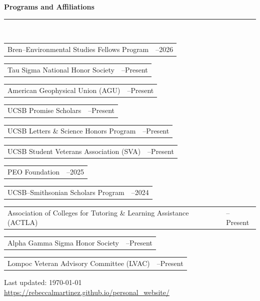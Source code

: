 \documentclass[letterpaper]{article}
\makeatletter
\def\footerlink{https://rebeccalmartinez.github.io/personal\_website/}
\newcommand{\sectionheader}[1]{%
  \noindent\textbf{\large #1} \\[-1ex]
  \noindent\rule{\linewidth}{0.4pt}\\[0.8ex]
}
\newlength{\datecolwidth}
\newcommand{\cvitem}[2]{%
  \noindent
  \begin{tabularx}{\textwidth}{@{}>{\raggedright\arraybackslash}X@{\hspace{1em}}>{\raggedleft\arraybackslash}p{\datecolwidth}@{}}
    #1 & #2 \\
  \end{tabularx}
  \vspace{0.2em}
}
\makeatother
\begin{document}
\sectionheader{Programs and Affiliations}
\cvitem{Bren–Environmental Studies Fellows Program}{2025–2026}  
\cvitem{Tau Sigma National Honor Society}{2025–Present} 
\cvitem{American Geophysical Union (AGU)}{2025–Present} 
\cvitem{UCSB Promise Scholars}{2024–Present}  
\cvitem{UCSB Letters \& Science Honors Program}{2024–Present} 
\cvitem{UCSB Student Veterans Association (SVA)}{2024–Present}  
\cvitem{PEO Foundation}{2024–2025}
\cvitem{UCSB–Smithsonian Scholars Program}{2023–2024}  
\cvitem{Association of Colleges for Tutoring \& Learning Assistance (ACTLA)}{2020–Present} 
\cvitem{Alpha Gamma Sigma Honor Society}{2019–Present} 
\cvitem{Lompoc Veteran Advisory Committee (LVAC)}{2018–Present}

\bigskip
\begin{center}
  \begin{footnotesize}
    Last updated: \today \\
    \href{\footerlink}{\url{\footerlink}}
  \end{footnotesize}
\end{center}
\end{document}
